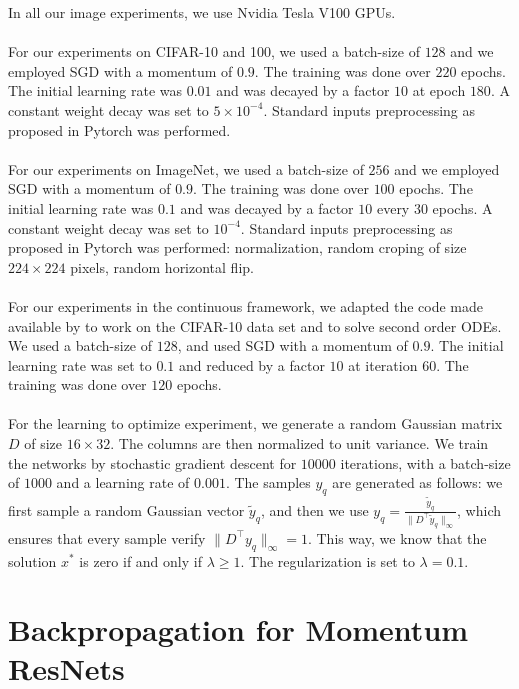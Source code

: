 \documentclass{article}
\begin{document}
In all our image experiments, we use Nvidia Tesla V100 GPUs.
\\
\\
For our experiments on CIFAR-10 and 100, we used a batch-size of $128$ and we employed SGD with a momentum of $0.9$. The training was done over $220$ epochs. The initial learning rate was $0.01$ and was decayed by a factor $10$ at epoch $180$. A constant weight decay was set to $5 \times 10^{-4}$. Standard inputs preprocessing as proposed in Pytorch \citep{paszke2017automatic} was performed.  
\\
\\
For our experiments on ImageNet, we used a batch-size of $256$ and we employed SGD with a momentum of $0.9$. The training was done over $100$ epochs. The initial learning rate was $0.1$ and was decayed by a factor $10$ every $30$ epochs. A constant weight decay was set to $10^{-4}$. Standard inputs preprocessing as proposed in Pytorch \citep{paszke2017automatic} was performed: normalization, random croping of size $224 \times 224$ pixels, random horizontal flip. 
\\
\\
For our experiments in the continuous framework, we adapted the code made available by \citet{chen2018neural} to work on the CIFAR-10 data set and to solve second order ODEs. We used a batch-size of $128$, and used SGD with a momentum of $0.9$. The initial learning rate was set to $0.1$ and reduced by a factor $10$ at iteration $60$. The training was done over $120$ epochs. 
\\
\\
For the learning to optimize experiment, we generate a random Gaussian matrix $D$ of size $16\times 32$. The columns are then normalized to unit variance.
We train the networks by stochastic gradient descent for $10000$ iterations, with a batch-size of $1000$ and a learning rate of $0.001$.
The samples $y_q$ are generated as follows:
we first sample a random Gaussian vector $\tilde{y}_q$, and then we use $y_q = \frac{\tilde{y}_q}{\|D^{\top}\tilde{y}_q\|_{\infty}}$, which ensures that every sample verify $\|D^{\top}y_q\|_{\infty} = 1$. This way, we know that the solution $x^*$ is zero if and only if $\lambda \geq 1$. The regularization is set to $\lambda = 0.1$.
\section{Backpropagation for Momentum ResNets}\label{app:backprop_mom_nets}
\end{document}
